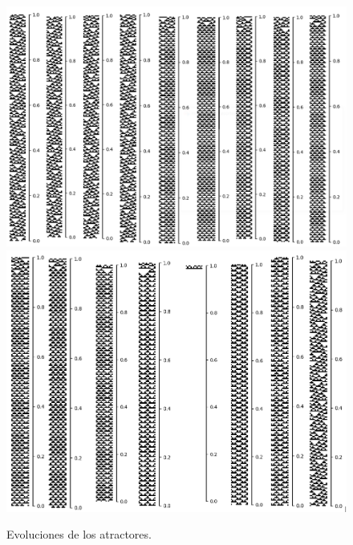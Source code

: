 \documentclass[11pt]{article}
\begin{document}
			\begin{figure}[H]
			\centering
			\includegraphics[scale=0.3]{resources/Atractores54/atractor_54_size_14_res.png}
			\includegraphics[scale=0.3]{resources/Atractores54/atractor_54_size_14_res1.png}
			\caption{Evoluciones de los atractores.}\label{fig:picture}
			\end{figure}
\end{document}
